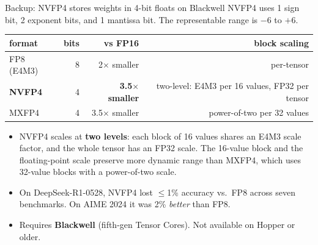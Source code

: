 \documentclass[aspectratio=169,10pt]{beamer}
\newcommand{\emphc}[1]{\textcolor{accent}{\textbf{#1}}}
\begin{document}
\begin{frame}{Backup: NVFP4 stores weights in 4-bit floats on Blackwell}
  \small
  NVFP4 uses 1 sign bit, 2 exponent bits, and 1 mantissa bit. The
  representable range is $-6$ to $+6$.
  \vspace{0.4em}
  \begin{center}
    \begin{tabular}{lrrr}
      \toprule
      \textbf{format} & \textbf{bits} & \textbf{vs FP16} & \textbf{block scaling} \\
      \midrule
      FP8 (E4M3)  & 8 & 2$\times$ smaller  & per-tensor \\
      \emphc{NVFP4} & 4 & \emphc{3.5$\times$ smaller} & two-level: E4M3 per 16
        values, FP32 per tensor \\
      MXFP4       & 4 & 3.5$\times$ smaller & power-of-two per 32 values \\
      \bottomrule
    \end{tabular}
  \end{center}
  \vspace{0.4em}
  \begin{itemize}\small
    \item NVFP4 scales at \textbf{two levels}: each block of 16 values shares
          an E4M3 scale factor, and the whole tensor has an FP32 scale. The
          16-value block and the floating-point scale preserve more dynamic
          range than MXFP4, which uses 32-value blocks with a power-of-two
          scale.
    \item On DeepSeek-R1-0528, NVFP4 lost $\leq$1\% accuracy vs.\ FP8 across
          seven benchmarks. On AIME 2024 it was 2\% \emph{better} than FP8.
    \item Requires \textbf{Blackwell} (fifth-gen Tensor Cores). Not available
          on Hopper or older.
  \end{itemize}
\end{frame}
\end{document}

